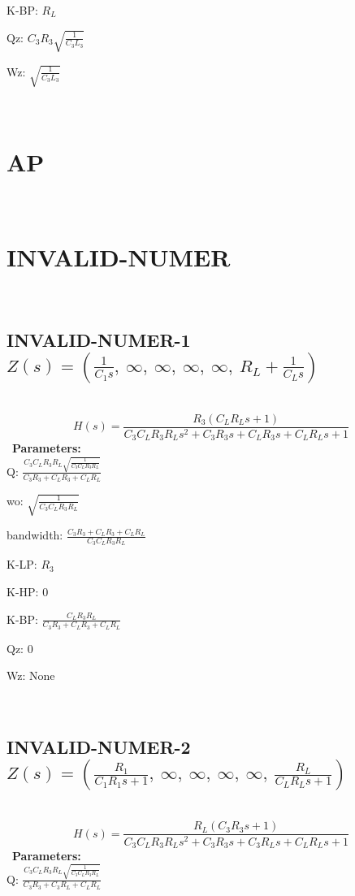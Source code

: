 \documentclass{article}
\begin{document}
K-BP: $R_{L}$\ 

Qz: $C_{3} R_{3} \sqrt{\frac{1}{C_{3} L_{3}}}$\ 

Wz: $\sqrt{\frac{1}{C_{3} L_{3}}}$\ 

\ 

\section{AP}\ 
\section{INVALID-NUMER}\ 
\subsection{INVALID-NUMER-1 $Z(s) = \left( \frac{1}{C_{1} s}, \  \infty, \  \infty, \  \infty, \  \infty, \  R_{L} + \frac{1}{C_{L} s}\right)$ } \ 
\textbf{\[H(s) = \frac{R_{3} \left(C_{L} R_{L} s + 1\right)}{C_{3} C_{L} R_{3} R_{L} s^{2} + C_{3} R_{3} s + C_{L} R_{3} s + C_{L} R_{L} s + 1}\] } \ 
\textbf{Parameters:}\\ 

Q: $\frac{C_{3} C_{L} R_{3} R_{L} \sqrt{\frac{1}{C_{3} C_{L} R_{3} R_{L}}}}{C_{3} R_{3} + C_{L} R_{3} + C_{L} R_{L}}$\ 

wo: $\sqrt{\frac{1}{C_{3} C_{L} R_{3} R_{L}}}$\ 

bandwidth: $\frac{C_{3} R_{3} + C_{L} R_{3} + C_{L} R_{L}}{C_{3} C_{L} R_{3} R_{L}}$\ 

K-LP: $R_{3}$\ 

K-HP: $0$\ 

K-BP: $\frac{C_{L} R_{3} R_{L}}{C_{3} R_{3} + C_{L} R_{3} + C_{L} R_{L}}$\ 

Qz: $0$\ 

Wz: $\text{None}$\ 

\ 

\subsection{INVALID-NUMER-2 $Z(s) = \left( \frac{R_{1}}{C_{1} R_{1} s + 1}, \  \infty, \  \infty, \  \infty, \  \infty, \  \frac{R_{L}}{C_{L} R_{L} s + 1}\right)$ } \ 
\textbf{\[H(s) = \frac{R_{L} \left(C_{3} R_{3} s + 1\right)}{C_{3} C_{L} R_{3} R_{L} s^{2} + C_{3} R_{3} s + C_{3} R_{L} s + C_{L} R_{L} s + 1}\] } \ 
\textbf{Parameters:}\\ 

Q: $\frac{C_{3} C_{L} R_{3} R_{L} \sqrt{\frac{1}{C_{3} C_{L} R_{3} R_{L}}}}{C_{3} R_{3} + C_{3} R_{L} + C_{L} R_{L}}$\ 
\end{document}
